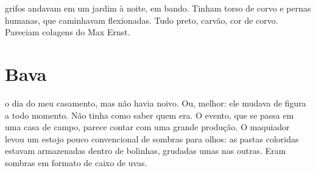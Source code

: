  grifos andavam em um jardim à noite, em bando. Tinham torso de corvo e pernas humanas, que caminhavam flexionadas. Tudo preto, carvão, cor de corvo. Pareciam colagens do Max Ernst.

\chapter*{Bava \smallskip{}}

 o dia do meu casamento, mas não havia noivo. Ou, melhor: ele mudava de figura a todo momento. Não tinha como saber quem era. O evento, que se passa em uma casa de campo, parece contar com uma grande produção. O maquiador levou um estojo pouco convencional de sombras para olhos: as pastas coloridas estavam armazenadas dentro de bolinhas, grudadas umas nas outras. Eram sombras em formato de caixo de uvas.

